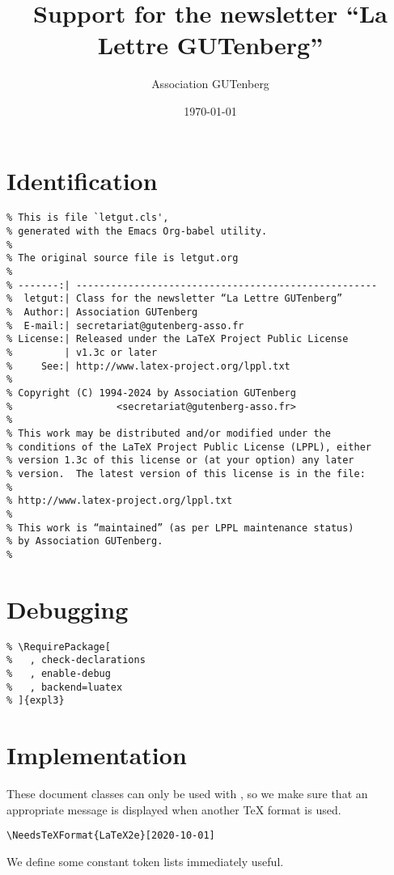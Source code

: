 \documentclass{letgut}
\author{Association GUTenberg}
\date{\today}
\title{Support for the newsletter “La Lettre GUTenberg”}
\begin{document}
\section{Identification}
\label{Identification-mn5g55h0jlj0}
\begin{lstlisting}
% This is file `letgut.cls',
% generated with the Emacs Org-babel utility.
%
% The original source file is letgut.org
%
% -------:| ----------------------------------------------------
%  letgut:| Class for the newsletter “La Lettre GUTenberg”
%  Author:| Association GUTenberg
%  E-mail:| secretariat@gutenberg-asso.fr
% License:| Released under the LaTeX Project Public License
%         | v1.3c or later
%     See:| http://www.latex-project.org/lppl.txt
%
% Copyright (C) 1994-2024 by Association GUTenberg
%                  <secretariat@gutenberg-asso.fr>
%
% This work may be distributed and/or modified under the
% conditions of the LaTeX Project Public License (LPPL), either
% version 1.3c of this license or (at your option) any later
% version.  The latest version of this license is in the file:
%
% http://www.latex-project.org/lppl.txt
%
% This work is “maintained” (as per LPPL maintenance status)
% by Association GUTenberg.
%
\end{lstlisting}

\section{Debugging}
\label{Debugging-846g55h0jlj0}
\begin{lstlisting}
% \RequirePackage[
%   , check-declarations
%   , enable-debug
%   , backend=luatex
% ]{expl3}
\end{lstlisting}

\section{Implementation}
\label{Implementation-vy6g55h0jlj0}
These document classes can only be used with \LaTeXe, so we make
sure that an appropriate message is displayed when another \TeX{}
format is used.

\begin{lstlisting}
\NeedsTeXFormat{LaTeX2e}[2020-10-01]
\end{lstlisting}

We define some constant token lists immediately useful.
\end{document}
